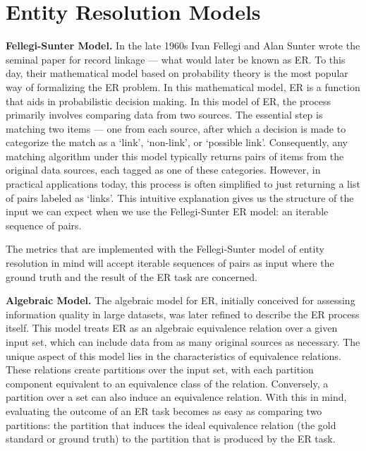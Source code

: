 \documentclass[a4paper,twoside]{article}
\begin{document}
    \section{Entity Resolution Models}\label{sec:models}
    \textbf{Fellegi-Sunter Model.}
    In the late 1960s Ivan Fellegi and Alan Sunter wrote the seminal
    paper\cite{fs1969} for record linkage --- what would later be known as ER.
    To this day, their mathematical model based on probability theory is the
    most popular way of formalizing the ER problem.
    In this mathematical model, ER is a function that aids in 
    probabilistic decision making.    
    In this model of ER, the process primarily involves comparing
    data from two sources.
    The essential step is matching two items --- one from each source, after
    which a decision is made to categorize the match as a `link', `non-link', or
    `possible link'.
    Consequently, any matching algorithm under this model typically returns
    pairs of items from the original data sources, each tagged as one of these
    categories.
    However, in practical applications today, this process is often simplified
    to just returning a list of pairs labeled as `links'. 
    This intuitive explanation gives us the structure of the input we can expect
    when we use the Fellegi-Sunter ER model: an iterable sequence
    of pairs.

    The metrics that are implemented with the Fellegi-Sunter model of entity
    resolution in mind will accept iterable sequences of pairs as input where
    the ground truth and the result of the ER task are concerned.

    \noindent\textbf{Algebraic Model.}
    The algebraic model for ER, initially conceived for assessing
    information quality in large datasets\cite{tal2007algebraic}, was later
    refined to describe the ER process itself\cite{Tal11}.
    This model treats ER as an algebraic equivalence relation
    over a given input set, which can include data from as many original sources
    as necessary.     
    The unique aspect of this model lies in the characteristics of equivalence
    relations\cite{halmos1960naive}.
    These relations create partitions over the input set, with each partition
    component equivalent to an equivalence class of the relation\cite{Tal11}.
    Conversely, a partition over a set can also induce an equivalence relation.
    With this in mind, evaluating the outcome of an ER task
    becomes as easy as comparing two partitions: the partition that induces the
    ideal equivalence relation (the gold standard or ground truth) to the
    partition that is produced by the ER task.
\end{document}
